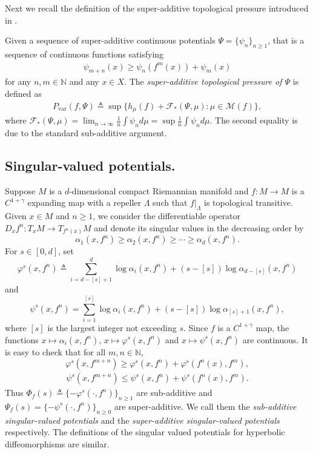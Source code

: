 \documentclass[11pt,a4paper]{amsart}
\theoremstyle{plain}
\theoremstyle{remark}
\begin{document}
	Next we recall the definition of the super-additive topological pressure introduced in \cite{caopesinzhao2019}.
	
	Given a sequence of super-additive continuous potentials $\Psi=\{\psi_{n}\}_{n\geq 1}$, that is a sequence of continuous functions satisfying
	\begin{align*}
		\psi_{m+n}(x)\geq \psi_{n}(f^{m}(x))+\psi_{m}(x)
	\end{align*}
	for any $n,m\in\mathbb{N}$ and any $x\in X$. The {\it super-additive topological pressure of $\Psi$} is defined as
	\begin{align*}
		P_{\text{var}}(f,\Psi)\triangleq \sup \{h_{\mu}(f)+\mathcal{F}_{\ast}(\Psi,\mu):\mu\in \mathcal{M}(f)\},
	\end{align*}
	where $\mathcal{F}_{\ast}(\Psi,\mu)=\lim_{n\rightarrow \infty}\frac{1}{n}\int \psi_{n}d\mu=\sup \frac{1}{n}\int \psi_{n}d\mu$. The second equality is due to the standard sub-additive argument.
	
	
	\subsection{Singular-valued potentials.}\label{sub}
	
	Suppose $M$ is a $d$-dimensional compact Riemannian manifold and $f:M\rightarrow M$ is a $C^{1+\gamma}$ expanding map with a repeller $\Lambda$ such that $f|_{\Lambda}$ is topological transitive. Given $x\in M$ and $n\geq 1$, we consider the differentiable operator $D_{x}f^{n}: T_{x}M\rightarrow T_{f^{n}(x)}M$ and denote its singular values in the decreasing order by
	$$\alpha_{1}(x,f^{n})\geq\alpha_{2}(x,f^{n})\geq\cdots\geq \alpha_{d}(x,f^{n}).$$
	For $s\in [0,d]$, set
	$$\varphi^{s}(x,f^{n})\triangleq\sum^{d}_{i=d-[s]+1} \log \alpha_{i}(x,f^{n})+(s-[s])\log\alpha_{d-[s]}(x,f^{n})$$
	and
	\begin{displaymath}
		\psi^{s}(x,f^{n})=\sum_{i=1}^{[s]}\log \alpha_{i}(x,f^{n})+(s-[s])\log \alpha_{[s]+1}(x,f^{n}),
	\end{displaymath}
	where $[s]$ is the largest integer not exceeding $s$. Since $f$ is a $C^{1+\gamma}$ map, the functions $x\mapsto \alpha_{i}(x,f^{n})$, $x\mapsto \varphi^{s}(x,f^{n})$ and $x\mapsto \psi^{s}(x,f^{n})$ are continuous.  It is easy to check that for all $m,n \in \mathbb{N}$,
	$$\varphi^{s}(x,f^{m+n})\geq \varphi^{s}(x,f^{n})+\varphi^{s}(f^n(x),f^{m}),$$
	\begin{align*}
		\psi^{s}(x,f^{m+n})\leq \psi^{s}(x,f^{n})+\psi^{s}(f^{n}(x),f^{m}).
	\end{align*}
	Thus $\Phi_{f}(s)\triangleq \{-\varphi^{s}(\cdot,f^{n})\}_{n\geq 1}$ are sub-additive and $\Psi_{f}(s)=\{-\psi^{s}(\cdot,f^{n})\}_{n\geq 0}$ are super-additive. We call them the {\it sub-additive singular-valued potentials} and the {\it super-additive singular-valued potentials }respectively.
	\iffalse
	The definitions of the singular valued potentials for hyperbolic diffeomorphisms are similar.
	
\end{document}
